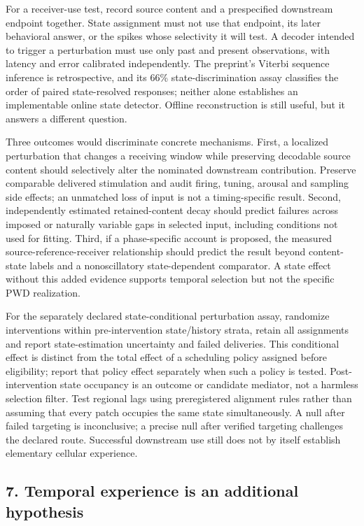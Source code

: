 \documentclass[
  american,
  11pt,
  letterpaper,
]{article}
\begin{document}
For a receiver-use test, record source content and a prespecified downstream endpoint together. State assignment must not use that endpoint, its later behavioral answer, or the spikes whose selectivity it will test. A decoder intended to trigger a perturbation must use only past and present observations, with latency and error calibrated independently. The preprint's Viterbi sequence inference is retrospective, and its 66\% state-discrimination assay classifies the order of paired state-resolved responses; neither alone establishes an implementable online state detector. Offline reconstruction is still useful, but it answers a different question.

Three outcomes would discriminate concrete mechanisms. First, a localized perturbation that changes a receiving window while preserving decodable source content should selectively alter the nominated downstream contribution. Preserve comparable delivered stimulation and audit firing, tuning, arousal and sampling side effects; an unmatched loss of input is not a timing-specific result. Second, independently estimated retained-content decay should predict failures across imposed or naturally variable gaps in selected input, including conditions not used for fitting. Third, if a phase-specific account is proposed, the measured source-reference-receiver relationship should predict the result beyond content-state labels and a nonoscillatory state-dependent comparator. A state effect without this added evidence supports temporal selection but not the specific PWD realization.

For the separately declared state-conditional perturbation assay, randomize interventions within pre-intervention state/history strata, retain all assignments and report state-estimation uncertainty and failed deliveries. This conditional effect is distinct from the total effect of a scheduling policy assigned before eligibility; report that policy effect separately when such a policy is tested. Post-intervention state occupancy is an outcome or candidate mediator, not a harmless selection filter. Test regional lags using preregistered alignment rules rather than assuming that every patch occupies the same state simultaneously. A null after failed targeting is inconclusive; a precise null after verified targeting challenges the declared route. Successful downstream use still does not by itself establish elementary cellular experience.

\subsection{7. Temporal experience is an additional hypothesis}\label{temporal-experience-is-an-additional-hypothesis}
\end{document}
